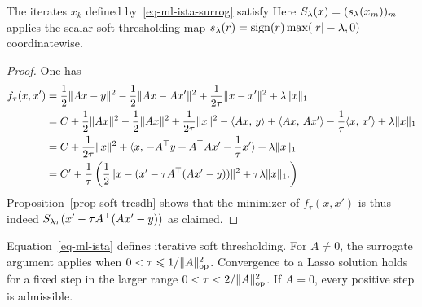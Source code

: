 \begin{prop}
	The iterates $x_k$ defined by~\eqref{eq-ml-ista-surrog} satisfy
	Here $S_\lambda(x) = (  s_\lambda(x_m) )_m$ applies the scalar soft-thresholding map $s_\lambda(r) = \operatorname{sign}(r) \max(|r|-\lambda,0)$ coordinatewise.
\end{prop}
\begin{proof}
	One has 
	\begin{align*}
		f_\tau(x,x') 
			&= \frac{1}{2}\lVert Ax-y\rVert^2 - \frac{1}{2}\lVert Ax-Ax'\rVert^2 + \frac{1}{2\tau}\lVert x-x'\rVert^2 + \lambda \lVert x\rVert_1 \\
			& = C + \frac{1}{2}\lVert Ax\rVert^2-\frac{1}{2}\lVert Ax\rVert^2+\frac{1}{2\tau}\lVert x\rVert^2
			- \langle Ax,\,y\rangle + \langle Ax,\,Ax'\rangle - \frac{1}{\tau}\langle x,\,x'\rangle
			+ \lambda \lVert x\rVert_1 \\
			& = C + \frac{1}{2\tau}\lVert x\rVert^2 + \langle x,\, -A^\top y+A^\top A x'-\frac{1}{\tau}x' \rangle + \lambda \lVert x\rVert_1 \\
			&= C' + \frac{1}{\tau}
				\left( 
					\frac{1}{2}\lVert x-(x'-\tau A^\top(Ax'-y))\rVert^2
					+ \tau \lambda \lVert x\rVert_1.
				 \right)
	\end{align*}
	Proposition~\ref{prop-soft-tresdh} shows that the minimizer of $f_\tau(x,x')$ is thus
	indeed $S_{\lambda\tau}( x' - \tau A^\top( A x' - y ) )$ as claimed.
\end{proof}

Equation~\eqref{eq-ml-ista} defines iterative soft thresholding. For $A\neq0$, the surrogate argument applies when $0<\tau\leqslant1/\lVert A\rVert_{\mathrm{op}}^2$. Convergence to a Lasso solution holds for a fixed step in the larger range $0<\tau<2/\lVert A\rVert_{\mathrm{op}}^2$. If $A=0$, every positive step is admissible.



